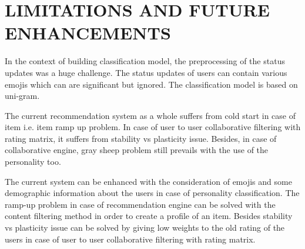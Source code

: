\newpage
\section{LIMITATIONS AND FUTURE ENHANCEMENTS}
In the context of building classification model, the preprocessing of the status updates was a huge challenge. The status updates of users can contain various emojis which can are significant but ignored. The classification model is based on uni-gram.

The current recommendation system as a whole suffers from cold start in case of item i.e. item ramp up problem. In case of user to user collaborative filtering with rating matrix, it suffers from stability vs plasticity issue. Besides, in case of collaborative engine, gray sheep problem still prevails with the use of the personality too.

The current system can be enhanced with the consideration of emojis and some demographic information about the users in case of personality classification. The ramp-up problem in case of recommendation engine can be solved with the content filtering method in order to create a profile of an item. Besides stability vs plasticity issue can be solved by giving low weights to the old rating of the users in case of user to user collaborative filtering with rating matrix.